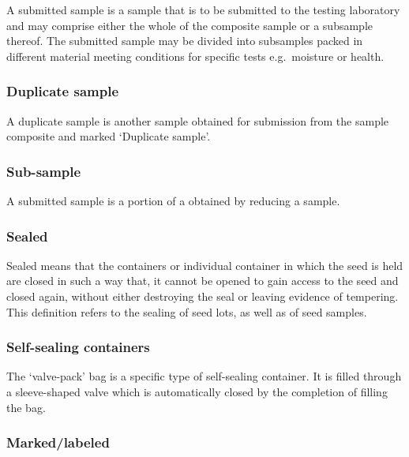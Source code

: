 \documentclass[
]{book}
\begin{document}
A submitted sample is a sample that is to be submitted to the testing laboratory and may comprise either the whole of the composite sample or a subsample thereof. The submitted sample may be divided into subsamples packed in different material meeting conditions for specific tests e.g.~moisture or health.

\hypertarget{duplicate-sample}{%
\subsubsection{Duplicate sample}\label{duplicate-sample}}

A duplicate sample is another sample obtained for submission from the sample composite and marked `Duplicate sample'.

\hypertarget{sub-sample}{%
\subsubsection{Sub-sample}\label{sub-sample}}

A submitted sample is a portion of a obtained by reducing a sample.

\hypertarget{sealed}{%
\subsubsection{Sealed}\label{sealed}}

Sealed means that the containers or individual container in which the seed is held are closed in such a way that, it cannot be opened to gain access to the seed and closed again, without either destroying the seal or leaving evidence of tempering. This definition refers to the sealing of seed lots, as well as of seed samples.

\hypertarget{self-sealing-containers}{%
\subsubsection{Self-sealing containers}\label{self-sealing-containers}}

The `valve-pack' bag is a specific type of self-sealing container. It is filled through a sleeve-shaped valve which is automatically closed by the completion of filling the bag.

\hypertarget{markedlabeled}{%
\subsubsection{Marked/labeled}\label{markedlabeled}}
\end{document}
